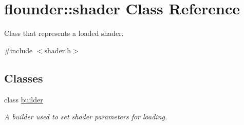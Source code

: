 \hypertarget{classflounder_1_1shader}{}\section{flounder\+:\+:shader Class Reference}
\label{classflounder_1_1shader}


Class that represents a loaded shader.  




{\ttfamily \#include $<$shader.\+h$>$}

\subsection*{Classes}
\begin{DoxyCompactItemize}
\item 
class \hyperlink{classflounder_1_1shader_1_1builder}{builder}
\begin{DoxyCompactList}\small\item\em A builder used to set shader parameters for loading. \end{DoxyCompactList}\end{DoxyCompactItemize}
